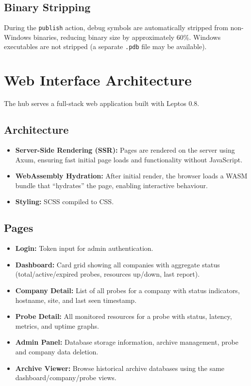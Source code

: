 \documentclass[12pt]{report}
\begin{document}
\subsection{Binary Stripping}

During the \texttt{publish} action, debug symbols are automatically stripped
from non-Windows binaries, reducing binary size by approximately 60\%. Windows
executables are not stripped (a separate \texttt{.pdb} file may be available).

\section{Web Interface Architecture}

The hub serves a full-stack web application built with Leptos 0.8.

\subsection{Architecture}

\begin{itemize}
    \item \textbf{Server-Side Rendering (SSR):} Pages are rendered on the
          server using Axum, ensuring fast initial page loads and
          functionality without JavaScript.
    \item \textbf{WebAssembly Hydration:} After initial render, the browser
          loads a WASM bundle that ``hydrates'' the page, enabling interactive
          behaviour.
    \item \textbf{Styling:} SCSS compiled to CSS.
\end{itemize}

\subsection{Pages}

\begin{itemize}
    \item \textbf{Login:} Token input for admin authentication.
    \item \textbf{Dashboard:} Card grid showing all companies with aggregate
          status (total/active/expired probes, resources up/down, last
          report).
    \item \textbf{Company Detail:} List of all probes for a company with
          status indicators, hostname, site, and last seen timestamp.
    \item \textbf{Probe Detail:} All monitored resources for a probe with
          status, latency, metrics, and uptime graphs.
    \item \textbf{Admin Panel:} Database storage information, archive
          management, probe and company data deletion.
    \item \textbf{Archive Viewer:} Browse historical archive databases using
          the same dashboard/company/probe views.
\end{itemize}
\end{document}

